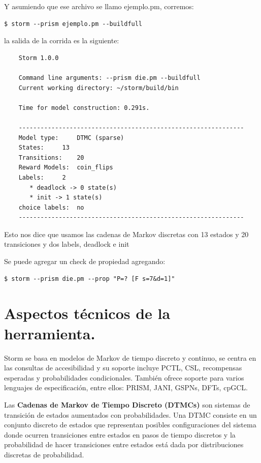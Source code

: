 \documentclass[11pt]{article}
\begin{document}
Y asumiendo que ese archivo se llamo ejemplo.pm, corremos:

\begin{verbatim}
$ storm --prism ejemplo.pm --buildfull
\end{verbatim}
					
la salida de la corrida es la siguiente:

\begin{verbatim}
	Storm 1.0.0

	Command line arguments: --prism die.pm --buildfull
	Current working directory: ~/storm/build/bin
	
	Time for model construction: 0.291s.
	
	--------------------------------------------------------------
	Model type: 	DTMC (sparse)
	States: 	13
	Transitions: 	20
	Reward Models:  coin_flips
	Labels: 	2
	   * deadlock -> 0 state(s)
	   * init -> 1 state(s)
	choice labels: 	no
	--------------------------------------------------------------
\end{verbatim}

Esto nos dice que usamos las cadenas de Markov discretas con 13 estados y 20 transiciones y dos labels, deadlock e init

Se puede agregar un check de propiedad agregando:

\begin{verbatim}
$ storm --prism die.pm --prop "P=? [F s=7&d=1]"
\end{verbatim}


\section{Aspectos t\'ecnicos de la herramienta.}

Storm se basa en modelos de Markov de tiempo discreto y continuo, se centra en las consultas de accesibilidad y su soporte incluye PCTL, CSL, recompensas esperadas y probabilidades condicionales. Tambi\'en ofrece soporte para varios lenguajes de especificaci\'on, entre ellos: PRISM, JANI, GSPNs, DFTs, cpGCL.

Las \textbf{Cadenas de Markov de Tiempo Discreto (DTMCs)} son sistemas de transici\'on de estados aumentados con probabilidades. Una DTMC consiste en un conjunto discreto de estados que representan posibles configuraciones del sistema donde ocurren transiciones entre estados en pasos de tiempo discretos y la probabilidad de hacer transiciones entre estados est\'a dada por distribuciones discretas de probabilidad.
 
\end{document}
